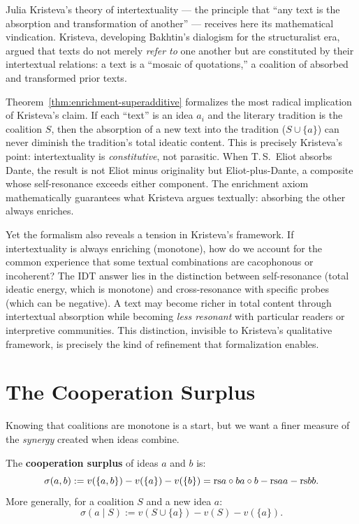 \begin{interpretation}
\label{interp:ch15:kristeva_intertextuality}
Julia Kristeva's theory of intertextuality --- the principle that ``any text is
the absorption and transformation of another'' --- receives here its
mathematical vindication.  Kristeva, developing Bakhtin's dialogism for the
structuralist era, argued that texts do not merely \emph{refer to} one another
but are constituted by their intertextual relations: a text is a ``mosaic of
quotations,'' a coalition of absorbed and transformed prior texts.

Theorem~\ref{thm:enrichment-superadditive} formalizes the most radical
implication of Kristeva's claim.  If each ``text'' is an idea $a_i$ and the
literary tradition is the coalition $S$, then the absorption of a new text
into the tradition ($S \cup \{a\}$) can never diminish the tradition's total
ideatic content.  This is precisely Kristeva's point: intertextuality is
\emph{constitutive}, not parasitic.  When T.\,S.\ Eliot absorbs Dante, the
result is not Eliot minus originality but Eliot-plus-Dante, a composite whose
self-resonance exceeds either component.  The enrichment axiom mathematically
guarantees what Kristeva argues textually: absorbing the other always enriches.

Yet the formalism also reveals a tension in Kristeva's framework.  If
intertextuality is always enriching (monotone), how do we account for the
common experience that some textual combinations are cacophonous or
incoherent?  The IDT answer lies in the distinction between self-resonance
(total ideatic energy, which is monotone) and cross-resonance with specific
probes (which can be negative).  A text may become richer in total content
through intertextual absorption while becoming \emph{less resonant} with
particular readers or interpretive communities.  This distinction, invisible
to Kristeva's qualitative framework, is precisely the kind of refinement that
formalization enables.
\end{interpretation}

\section{The Cooperation Surplus}

Knowing that coalitions are monotone is a start, but we want a finer measure
of the \emph{synergy} created when ideas combine.

\begin{definition}
\label{def:cooperation-surplus}
The \textbf{cooperation surplus} of ideas $a$ and $b$ is:
\[
  \sigma(a, b) := v(\{a, b\}) - v(\{a\}) - v(\{b\})
  = \mathrm{rs}{a \circ b}{a \circ b} - \mathrm{rs}{a}{a} - \mathrm{rs}{b}{b}.
\]
More generally, for a coalition $S$ and a new idea $a$:
\[
  \sigma(a \mid S) := v(S \cup \{a\}) - v(S) - v(\{a\}).
\]
\end{definition}

